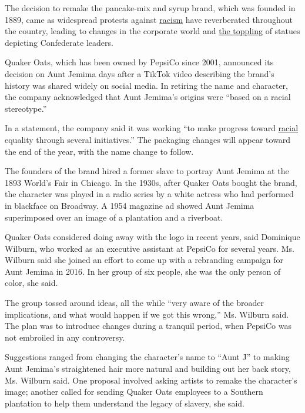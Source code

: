 The decision to remake the pancake-mix and syrup brand, which was
founded in 1889, came as widespread protests against
\href{https://www.nytimes.com/2020/07/10/sports/football/washington-redskins-name-change-mascots.html}{racism}
have reverberated throughout the country, leading to changes in the
corporate world and
\href{https://www.nytimes.com/2020/06/11/us/Jefferson-Davis-Statue-Richmond.html}{the
toppling} of statues depicting Confederate leaders.

Quaker Oats, which has been owned by PepsiCo since 2001, announced its
decision on Aunt Jemima days after a TikTok video describing the brand's
history was shared widely on social media. In retiring the name and
character, the company acknowledged that Aunt Jemima's origins were
``based on a racial stereotype.''

In a statement, the company said it was working ``to make progress
toward
\href{https://www.nytimes.com/2020/07/10/sports/football/washington-redskins-name-change-mascots.html}{racial}
equality through several initiatives.'' The packaging changes will
appear toward the end of the year, with the name change to follow.

The founders of the brand hired a former slave to portray Aunt Jemima at
the 1893 World's Fair in Chicago. In the 1930s, after Quaker Oats bought
the brand, the character was played in a radio series by a white actress
who had performed in blackface on Broadway. A 1954 magazine ad showed
Aunt Jemima superimposed over an image of a plantation and a riverboat.

Quaker Oats considered doing away with the logo in recent years, said
Dominique Wilburn, who worked as an executive assistant at PepsiCo for
several years. Ms. Wilburn said she joined an effort to come up with a
rebranding campaign for Aunt Jemima in 2016. In her group of six people,
she was the only person of color, she said.

The group tossed around ideas, all the while ``very aware of the broader
implications, and what would happen if we got this wrong,'' Ms. Wilburn
said. The plan was to introduce changes during a tranquil period, when
PepsiCo was not embroiled in any controversy.

Suggestions ranged from changing the character's name to ``Aunt J'' to
making Aunt Jemima's straightened hair more natural and building out her
back story, Ms. Wilburn said. One proposal involved asking artists to
remake the character's image; another called for sending Quaker Oats
employees to a Southern plantation to help them understand the legacy of
slavery, she said.

